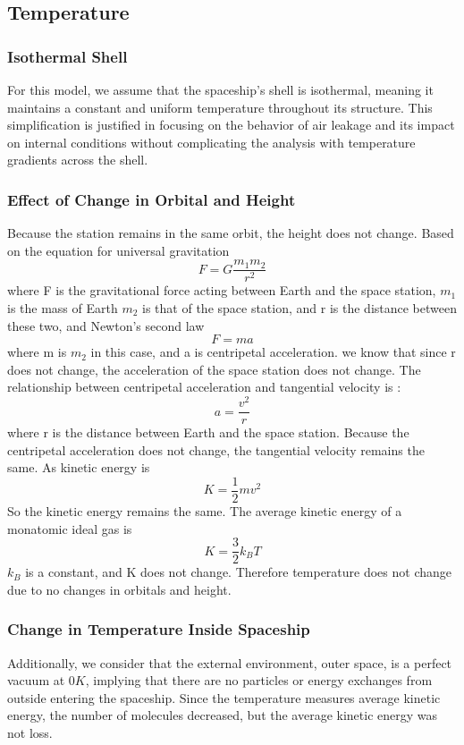 \subsection{Temperature}
\subsubsection{Isothermal Shell}
For this model, we assume that the spaceship's shell is isothermal, meaning it maintains a constant and uniform temperature throughout its structure. This simplification is justified in focusing on the behavior of air leakage and its impact on internal conditions without complicating the analysis with temperature gradients across the shell.

\subsubsection{Effect of Change in Orbital and Height}
 Because the station remains in the same orbit, the height does not change. Based on the equation for universal gravitation 
\[
F=G\frac{m_1m_2}{r^2}
\]
where F is the gravitational force acting between Earth and the space station, $m_1$ is the mass of Earth $m_2$ is that of the space station, and r is the distance between these two,  and Newton's second law\[
F=ma
\]
where m is  $m_2$ in this case, and a is centripetal acceleration. we know that since r does not change, the acceleration of the space station does not change. The relationship between centripetal acceleration and tangential velocity is :
\[
a=\frac{v^2}{r}
\]
where r is the distance between Earth and the space station. Because the centripetal acceleration does not change, the tangential velocity remains the same. As kinetic energy is \[
K=\frac{1}{2}mv^2
\]
So the kinetic energy remains the same. The average kinetic energy of a monatomic ideal gas is\cite{Kittel1980}\cite{Tolman1938}
\[
K=\frac{3}{2}k_B T
\]
$k_B$ is a constant, and K does not change. Therefore temperature does not change due to no changes in orbitals and height.

\subsubsection{Change in Temperature Inside Spaceship}
Additionally, we consider that the external environment, outer space, is a perfect vacuum at $0K$, implying that there are no particles or energy exchanges from outside entering the spaceship. Since the temperature measures average kinetic energy, the number of molecules decreased, but the average kinetic energy was not loss. 


